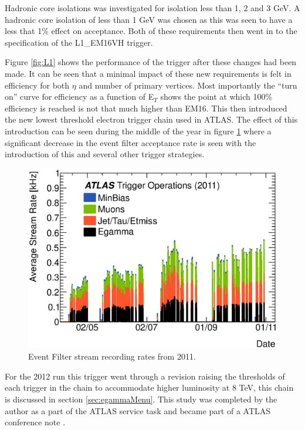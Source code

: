 		Hadronic core isolations was investigated for isolation less than 1, 2 and 3 GeV. A hadronic core isolation of less than 1 GeV was chosen as this was seen to have a less that 1\% effect on acceptance. Both of these requirements then went in to the specification of the L1\_EM16VH trigger.


		Figure \ref{fig:L1} shows the performance of the trigger after these changes had been made. It can be seen that a minimal impact of these new requirements is felt in efficiency for both $\eta$ and number of primary vertices. Most importantly the ``turn on'' curve for efficiency as a function of E$_{T}$ shows the point at which 100\% efficiency is reached is not that much higher than EM16. This then introduced the new lowest threshold electron trigger chain used in ATLAS. The effect of this introduction can be seen during the middle of the year in figure \ref{fig:EF_rate} where a significant decrease in the event filter acceptance rate is seen with the introduction of this and several other trigger strategies. 


		\begin{figure}[h!]
			\centering
				\includegraphics[width=0.8\linewidth]{images/2011_streams_quarter_day.eps}
			\caption{Event Filter stream recording rates from 2011. \cite{Trigger_op_2011}}
			\label{fig:EF_rate}
		\end{figure}


		For the 2012 run this trigger went through a revision raising the thresholds of each trigger in the chain to accommodate higher luminosity at 8 TeV, this chain is discussed in section \ref{sec:egammaMenu}. This study was completed by the author as a part of the ATLAS service task and became part of a ATLAS conference note \cite{ATLAS-CONF-2012-048}.



